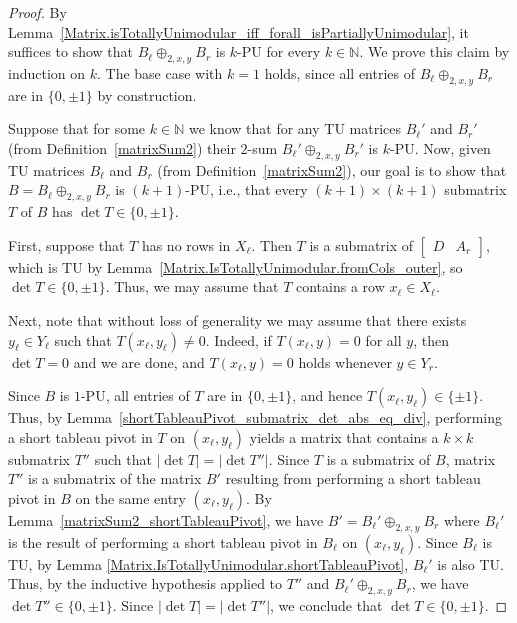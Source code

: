 \begin{proof}
    \leanok
    By Lemma~\ref{Matrix.isTotallyUnimodular_iff_forall_isPartiallyUnimodular}, it suffices to show that $B_{\ell} \oplus_{2, x, y} B_{r}$ is $k$-PU for every $k \in \mathbb{N}$. We prove this claim by induction on $k$. The base case with $k = 1$ holds, since all entries of $B_{\ell} \oplus_{2, x, y} B_{r}$ are in $\{0, \pm 1\}$ by construction.

    Suppose that for some $k \in \mathbb{N}$ we know that for any TU matrices $B_{\ell}'$ and $B_{r}'$ (from Definition~\ref{matrixSum2}) their $2$-sum $B_{\ell}' \oplus_{2, x, y} B_{r}'$ is $k$-PU. Now, given TU matrices $B_{\ell}$ and $B_{r}$ (from Definition~\ref{matrixSum2}), our goal is to show that $B = B_{\ell} \oplus_{2, x, y} B_{r}$ is $(k + 1)$-PU, i.e., that every $(k + 1) \times (k + 1)$ submatrix $T$ of $B$ has $\det T \in \{0, \pm 1\}$.

    First, suppose that $T$ has no rows in $X_{\ell}$. Then $T$ is a submatrix of $\begin{bmatrix} D & A_{r} \end{bmatrix}$, which is TU by Lemma~\ref{Matrix.IsTotallyUnimodular.fromCols_outer}, so $\det T \in \{0, \pm 1\}$. Thus, we may assume that $T$ contains a row $x_{\ell} \in X_{\ell}$.

    Next, note that without loss of generality we may assume that there exists $y_{\ell} \in Y_{\ell}$ such that $T (x_{\ell}, y_{\ell}) \neq 0$. Indeed, if $T (x_{\ell}, y) = 0$ for all $y$, then $\det T = 0$ and we are done, and $T (x_{\ell}, y) = 0$ holds whenever $y \in Y_{r}$.

    Since $B$ is $1$-PU, all entries of $T$ are in $\{0, \pm 1\}$, and hence $T (x_{\ell}, y_{\ell}) \in \{\pm 1\}$. Thus, by Lemma~\ref{shortTableauPivot_submatrix_det_abs_eq_div}, performing a short tableau pivot in $T$ on $(x_{\ell}, y_{\ell})$ yields a matrix that contains a $k \times k$ submatrix $T''$ such that $|\det T| = |\det T''|$. Since $T$ is a submatrix of $B$, matrix $T''$ is a submatrix of the matrix $B'$ resulting from performing a short tableau pivot in $B$ on the same entry $(x_{\ell}, y_{\ell})$. By Lemma~\ref{matrixSum2_shortTableauPivot}, we have $B' = B_{\ell}' \oplus_{2, x, y} B_{r}$ where $B_{\ell}'$ is the result of performing a short tableau pivot in $B_{\ell}$ on $(x_{\ell}, y_{\ell})$. Since $B_{\ell}$ is TU, by Lemma \ref{Matrix.IsTotallyUnimodular.shortTableauPivot}, $B_{\ell}'$ is also TU. Thus, by the inductive hypothesis applied to $T''$ and $B_{\ell}' \oplus_{2, x, y} B_{r}$, we have $\det T'' \in \{0, \pm 1\}$. Since $|\det T| = |\det T''|$, we conclude that $\det T \in \{0, \pm 1\}$.
\end{proof}

